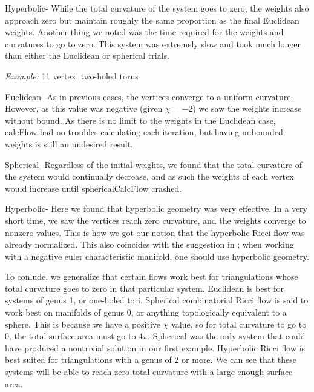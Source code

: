 \documentclass[12pt]{article}
\begin{document}
\noindent Hyperbolic- While the total curvature of the system goes to zero, the weights also approach zero but maintain roughly the same proportion as the final Euclidean weights. Another thing we noted was the time required for the weights and curvatures to go to zero. This system was extremely slow and took much longer than either the Euclidean or spherical trials. \newline

\noindent \textit{Example:} 11 vertex, two-holed torus\newline

\noindent Euclidean- As in previous cases, the vertices converge to a uniform curvature. However, as this value was negative (given $\chi = -2$) we saw the weights increase without bound. As there is no limit to the weights in the Euclidean case, calcFlow had no troubles calculating each iteration, but having unbounded weights is still an undesired result. \newline

\noindent Spherical- Regardless of the initial weights, we found that the total curvature of the system would continually decrease, and as such the weights of each vertex would increase until sphericalCalcFlow crashed. \newline

\noindent Hyperbolic- Here we found that hyperbolic geometry was very effective. In a very short time, we saw the vertices reach zero curvature, and the weights converge to nonzero values. This is how we got our notion that the hyperbolic Ricci flow was already normalized. This also coincides with the suggestion in \cite{chowluo}; when working with a negative euler characteristic manifold, one should use hyperbolic geometry.\newline

\noindent To conlude, we generalize that certain flows work best for triangulations whose total curvature goes to zero in that particular system. Euclidean is best for systems of genus 1, or one-holed tori. Spherical combinatorial Ricci flow is said to work best on manifolds of genus 0, or anything topologically equivalent to a sphere. This is because we have a positive $\chi$ value, so for total curvature to go to 0, the total surface area must go to $4\pi$. Spherical was the only system that could have produced a nontrivial solution in our first example. Hyperbolic Ricci flow is best suited for triangulations with a genus of 2 or more. We can see that these systems will be able to reach zero total curvature with a large enough surface area. 
\end{document}
